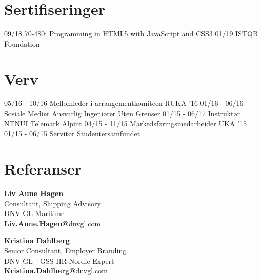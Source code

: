 \documentclass[]{friggeri-cv}
\begin{document}
\section{Sertifiseringer}
\begin{entrylist}
   \entry
   {09/18}
   {70-480: Programming in HTML5 with JavaScript and CSS3}
   {}
   {}
   \entry
   {01/19}
   {ISTQB Foundation}
   {}
   {}
\end{entrylist}

\section{Verv}
\begin{entrylist}
   \entry
    {05/16 - 10/16}
    {Mellomleder i arrangementkomitéen}
    {RUKA '16}
    {}
  \entry
    {01/16 - 06/16}
    {Sosiale Medier Ansvarlig}
    {Ingeniører Uten Grenser}
    {}
\entry
    {01/15 - 06/17}
    {Instruktør}
    {NTNUI Telemark Alpint}
    {}
  \entry
    {04/15 - 11/15}
    {Markedsføringsmedarbeider}
    {UKA '15}
    {}
  \entry
    {01/15 - 06/15}
    {Servitør}
    {Studentersamfundet}
    {}
\end{entrylist}

\section{Referanser}
\begin{minipage}{.45\linewidth}
\begin{flushleft}                           
\textbf{Liv Aune Hagen}\\
Consultant, Shipping Advisory \\
DNV GL Maritime\\
\href{mailto:Liv.Aune.Hagen@dnvgl.com}{\textbf{Liv.Aune.Hagen@}dnvgl.com}
\vspace{2mm}
\end{flushleft} 
\end{minipage}
\hfill
\begin{minipage}{.45\linewidth}
\begin{flushright}                                  \textbf{Kristina Dahlberg} \\
Senior Consultant, Employer Branding \\
DNV GL - GSS HR Nordic Expert \\
\href{mailto:Kristina.Dahlberg@dnvgl.com}{\textbf{Kristina.Dahlberg@}dnvgl.com}
\end{flushright} 
\end{minipage}
\end{document}
